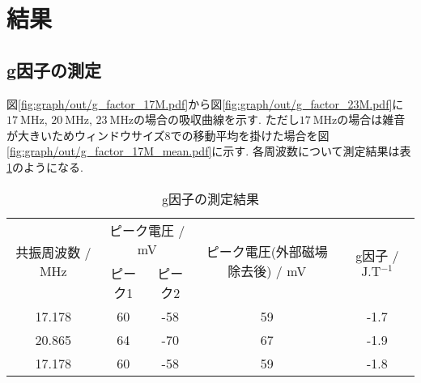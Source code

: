 \section{結果}
\subsection{g因子の測定}
図\ref{fig:graph/out/g_factor_17M.pdf}から図\ref{fig:graph/out/g_factor_23M.pdf}に$17\ \si{\mega\hertz}$, $20\ \si{\mega\hertz}$, $23\ \si{\mega\hertz}$の場合の吸収曲線を示す.
ただし$17\ \si{\mega\hertz}$の場合は雑音が大きいためウィンドウサイズ8での移動平均を掛けた場合を図\ref{fig:graph/out/g_factor_17M_mean.pdf}に示す.
各周波数について測定結果は表\ref{tab:ginsi}のようになる.
\begin{table}[h]
\caption{g因子の測定結果}
\label{tab:ginsi}
\centering
\begin{tabular}{ccccc}
\hline
\multirow{2}{*}{共振周波数 / MHz}&\multicolumn{2}{c}{ピーク電圧 / mV}&\multirow{2}{*}{ピーク電圧(外部磁場除去後) / mV}&\multirow{2}{*}{g因子 / $\si{\joule.\tesla^{-1}}$}\\
&ピーク1&ピーク2\\
\hline \hline
17.178&60&-58&59&-1.7\\
20.865&64&-70&67&-1.9\\
17.178&60&-58&59&-1.8\\
\hline
\end{tabular}
\end{table}
\newpage
\begin{figure}[htbp]
  \begin{minipage}{0.5\hsize}
  \end{minipage}
  \begin{minipage}{0.5\hsize}
  \end{minipage}
\end{figure}
\newpage
{}
